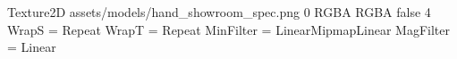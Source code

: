 Texture2D
assets/models/hand_showroom_spec.png
0
RGBA
RGBA
false
4
WrapS = Repeat
WrapT = Repeat
MinFilter = LinearMipmapLinear
MagFilter = Linear
